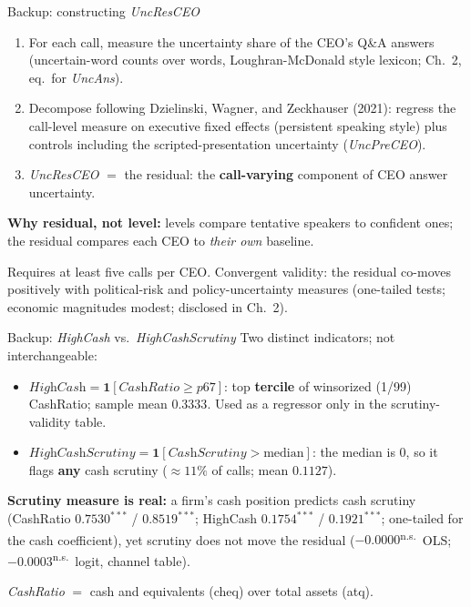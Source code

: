 \documentclass[aspectratio=169, 11pt]{beamer}
\newcommand{\ns}{\textsuperscript{n.s.}}
\begin{document}
\begin{frame}[noframenumbering]{Backup: constructing \textit{UncResCEO}}
  \begin{enumerate}
    \item For each call, measure the uncertainty share of the CEO's Q\&A
      answers (uncertain-word counts over words, Loughran-McDonald style
      lexicon; Ch.\ 2, eq.\ for \textit{UncAns}).
    \item Decompose following Dzielinski, Wagner, and Zeckhauser (2021):
      regress the call-level measure on executive fixed effects (persistent
      speaking style) plus controls including the scripted-presentation
      uncertainty (\textit{UncPreCEO}).
    \item \textit{UncResCEO} $=$ the residual: the \textbf{call-varying}
      component of CEO answer uncertainty.
  \end{enumerate}
  \vspace{0.5em}
  \textbf{Why residual, not level:} levels compare tentative speakers to
  confident ones; the residual compares each CEO to \emph{their own} baseline.
  \vspace{0.2em}

  {\scriptsize Requires at least five calls per CEO. Convergent validity: the
  residual co-moves positively with political-risk and policy-uncertainty
  measures (one-tailed tests; economic magnitudes modest; disclosed in Ch.\ 2).}
\end{frame}

\begin{frame}[noframenumbering]{Backup: \textit{HighCash} vs.\ \textit{HighCashScrutiny}}
  Two distinct indicators; not interchangeable:
  \vspace{0.4em}
  \begin{itemize}
    \item $\textit{HighCash} = \mathbf{1}[\textit{CashRatio} \ge p67]$:
      top \textbf{tercile} of winsorized (1/99) CashRatio; sample mean $0.3333$.
      Used as a regressor only in the scrutiny-validity table.
    \item $\textit{HighCashScrutiny} = \mathbf{1}[\textit{CashScrutiny} > \text{median}]$:
      the median is 0, so it flags \textbf{any} cash scrutiny
      ($\approx 11\%$ of calls; mean $0.1127$).
  \end{itemize}
  \vspace{0.5em}
  \textbf{Scrutiny measure is real:} a firm's cash position predicts cash
  scrutiny (CashRatio $0.7530^{***}$ / $0.8519^{***}$; HighCash
  $0.1754^{***}$ / $0.1921^{***}$; one-tailed for the cash coefficient),
  yet scrutiny does not move the residual
  ($-0.0000$\ns\ OLS; $-0.0003$\ns\ logit, channel table).
  \vspace{0.4em}

  {\small \textit{CashRatio} $=$ cash and equivalents (cheq) over total assets (atq).}
\end{frame}
\end{document}
